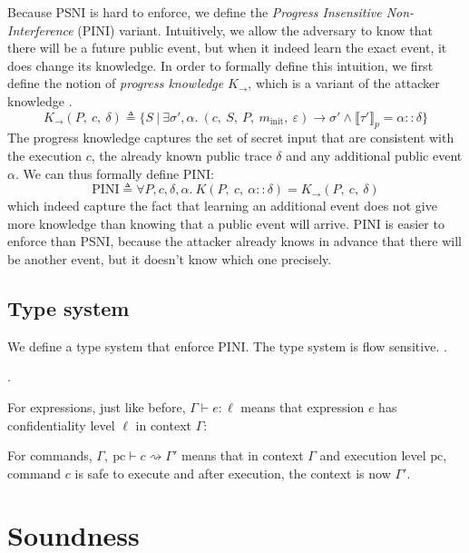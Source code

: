 \documentclass[10pt]{article}
\newcommand{\pc}{\mathrm{pc}}
\newcommand{\ctx}{\Gamma}
\newcommand{\conf}{\sigma}
\newcommand{\typing}[4]{ #1,~#2 \vdash #3 \rightsquigarrow #4}
\newcommand{\exec}[2] { #1 \rightarrow #2 }
\newcommand{\pproj}[1]{\llbracket #1 \rrbracket_{p}}
\newcommand{\etyping}[3]{ #1 \vdash #2 : #3}
\begin{document}
Because PSNI is hard to enforce, we define the \emph{Progress Insensitive Non-Interference} (PINI)
variant. Intuitively, we allow the adversary to know that there will be a future public event, but
when it indeed learn the exact event, it does change its knowledge. In order to formally define this
intuition, we first define the notion of \emph{progress knowledge} $K_{\rightarrow}$, which is a
variant of the attacker knowledge .
\[
  K_{\rightarrow}(P,~c,~\delta) \triangleq
  \{ S ~|~ \exists \conf',\alpha.\
  \exec{(c,~S,~P,~m_{\mathrm{init}},~\varepsilon)}{\conf'}
  \wedge
  \pproj{\tau'} = \alpha::\delta
  \}
\]
The progress knowledge captures the set of secret input that are consistent with the execution $c$,
the already known public trace $\delta$ and any additional public event $\alpha$.
We can thus formally define PINI:
\[
  \mathrm{PINI} \triangleq
  \forall P,c,\delta,\alpha. \ K(P,~c,~\alpha::\delta) = K_{\rightarrow}(P,~c,~\delta)
\]
which indeed capture the fact that learning an additional event does not give more knowledge than
knowing that a public event will arrive.
PINI is easier to enforce than PSNI, because the attacker already knows in advance that there will
be another event, but it doesn't know which one precisely.

\subsection{Type system}%
\label{subsec:type_system}

We define a type system that enforce PINI.
The type system is flow sensitive.
.

.

For expressions, just like before, \( \etyping{\ctx}{e}{\ell} \) means that expression \( e \) has
confidentiality level \( \ell \) in context \( \ctx \):



For commands, \( \typing{\ctx}{\pc}{c}{\ctx'} \) means that in context \( \ctx \) and execution
level \( \pc \), command \( c \) is safe to execute and after execution, the context is now
\( \ctx' \).




\section{Soundness}%
\label{sec:soundness}
\end{document}
